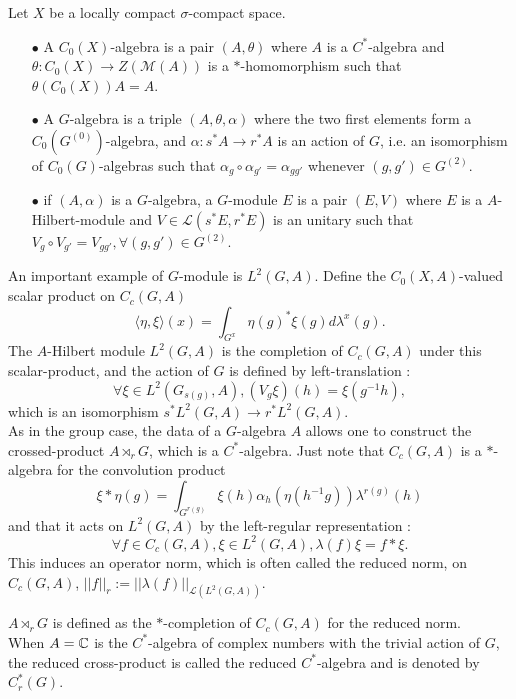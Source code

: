 \begin{definition}
Let $X$ be a locally compact $\sigma$-compact space.\\
\begin{itemize}
\item[$\bullet$] A $C_0(X)$-algebra is a pair $(A,\theta)$ where $A$ is a $C^*$-algebra and $\theta : C_0(X)\rightarrow Z(\mathcal M (A))$ is a $*$-homomorphism such that $\theta (C_0(X))A = A$.\\
\item[$\bullet$] A $G$-algebra is a triple $(A,\theta,\alpha)$ where the two first elements form a $C_0(G^{(0)})$-algebra, and $\alpha : s^* A \rightarrow r^* A $ is an action of $G$, i.e. an isomorphism of $C_0(G)$-algebras such that $\alpha_g \circ \alpha_{g'} = \alpha_{gg'}$ whenever $(g,g')\in G^{(2)}$.\\ 
\item[$\bullet$] if $(A,\alpha)$ is a $G$-algebra, a $G$-module $E$ is a pair $(E,V)$ where $E$ is a $A$-Hilbert-module and $V\in \mathcal L(s^*E,r^*E)$ is an unitary such that $V_g\circ V_{g'} = V_{gg'},\forall (g,g')\in G^{(2)}$.
\end{itemize}
\end{definition}

An important example of $G$-module is $L^2(G,A)$. Define the $C_0(X,A)$-valued scalar product on $C_c(G,A)$
\[ \langle \eta,\xi \rangle(x) = \int_{G^x} \eta(g)^* \xi(g) d\lambda^x(g).\]
The $A$-Hilbert module $L^2(G,A)$ is the completion of $C_c(G,A)$ under this scalar-product, and the action of $G$ is defined by left-translation :
\[\forall \xi\in L^2(G_{s(g)},A),(V_g \xi)(h) = \xi(g^{-1}h), \]
which is an isomorphism $s^*L^2(G,A)\rightarrow r^*L^2(G,A)$.\\

As in the group case, the data of a $G$-algebra $A$ allows one to construct the crossed-product $A\rtimes_r G$, which is a $C^*$-algebra. Just note that $C_c(G,A)$ is a $*$-algebra for the convolution product 
\[\xi \ast \eta  (g)=\int_{G^{r(g)}} \xi(h)\alpha_{h}(\eta(h^{-1}g))\lambda^{r(g)}(h)\]
and that it acts on $L^2(G,A)$ by the left-regular representation :
\[\forall f\in C_c(G,A), \xi\in L^2(G,A),\lambda (f)\xi = f\ast \xi.\]
This induces an operator norm, which is often called the reduced norm, on $C_c(G,A)$, $||f||_{r}:= ||\lambda(f)||_{\mathcal L(L^2(G,A))}$.
\begin{definition}
$A\rtimes_r G$ is defined as the $*$-completion of $C_c(G,A)$ for the reduced norm. \\
When $A=\mathbb C$ is the $C^*$-algebra of complex numbers with the trivial action of $G$, the reduced cross-product is called the reduced $C^*$-algebra and is denoted by $C^*_r(G)$.\\
\end{definition}

